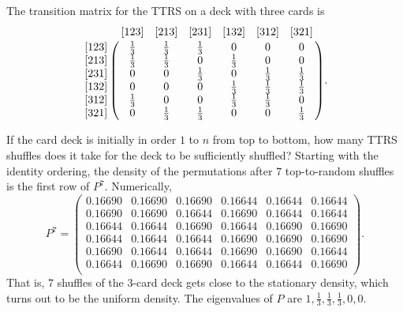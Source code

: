 \documentclass[12pt]{article}
\begin{document}
\begin{example}
    The transition matrix for the TTRS on a deck with three cards is
    \[
        \bordermatrix{ & [123] & [213] & [231] & [132] & [312] & [321]
        \cr
        [123] & \frac{1}{3} & \frac{1}{3} & \frac{1}{3} & 0 & 0 & 0 \cr
        [213] & \frac{1}{3} & \frac{1}{3} & 0 & \frac{1}{3} & 0 & 0 \cr
        [231] & 0 & 0 & \frac{1}{3} & 0 & \frac{1}{3} & \frac{1}{3} \cr
        [132] & 0 & 0 & 0 & \frac{1}{3} & \frac{1}{3} & \frac{1}{3} \cr
        [312] & \frac{1}{3} & 0 & 0 & \frac{1}{3} & \frac{1} {3} & 0 \cr
        [321] & 0 & \frac{1}{3} & \frac{1}{3} & 0 & 0 & \frac{1}{3} \cr
        }.
    \]

    If the card deck is initially in order \( 1 \) to \( n \) from top
    to bottom, how many TTRS shuffles does it take for the deck to be
    sufficiently shuffled?  Starting with the identity ordering, the
    density of the permutations after \( 7 \) top-to-random shuffles is
    the first row of \( P^7 \).  Numerically,
    \[
        P^7 =
        \begin{pmatrix}
            0.16690 & 0.16690 & 0.16690 & 0.16644 & 0.16644 & 0.16644 \\
            0.16690 & 0.16690 & 0.16644 & 0.16690 & 0.16644 & 0.16644 \\
            0.16644 & 0.16644 & 0.16690 & 0.16644 & 0.16690 & 0.16690 \\
            0.16644 & 0.16644 & 0.16644 & 0.16690 & 0.16690 & 0.16690 \\
            0.16690 & 0.16644 & 0.16644 & 0.16690 & 0.16690 & 0.16644 \\
            0.16644 & 0.16690 & 0.16690 & 0.16644 & 0.16644 & 0.16690 \\
        \end{pmatrix}
        .
    \] That is, \( 7 \) shuffles of the 3-card deck gets close to the
    stationary density, which turns out to be the uniform density. The
    eigenvalues of \( P \) are \( 1, \frac{1}{3}, \frac{1}{3}, \frac {1}
    {3}, 0, 0 \).

\end{example}
\end{document}
